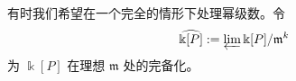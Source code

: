 
有时我们希望在一个完全的情形下处理幂级数。令
\[
  \widehat{\Bbbk[P]}:=\varprojlim\Bbbk[P]/\mathfrak m^k
\]
为 $\Bbbk[P]$ 在理想 $\mathfrak m$ 处的完备化。

